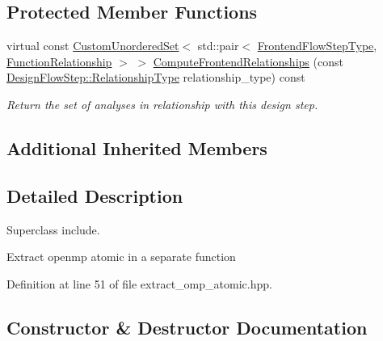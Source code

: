 \subsection*{Protected Member Functions}
\begin{DoxyCompactItemize}
\item 
virtual const \hyperlink{classCustomUnorderedSet}{Custom\+Unordered\+Set}$<$ std\+::pair$<$ \hyperlink{frontend__flow__step_8hpp_afeb3716c693d2b2e4ed3e6d04c3b63bb}{Frontend\+Flow\+Step\+Type}, \hyperlink{classFrontendFlowStep_af7cf30f2023e5b99e637dc2058289ab0}{Function\+Relationship} $>$ $>$ \hyperlink{classExtractOmpAtomic_a4d219d130ec92a7fdfea32a4b7df167a}{Compute\+Frontend\+Relationships} (const \hyperlink{classDesignFlowStep_a723a3baf19ff2ceb77bc13e099d0b1b7}{Design\+Flow\+Step\+::\+Relationship\+Type} relationship\+\_\+type) const
\begin{DoxyCompactList}\small\item\em Return the set of analyses in relationship with this design step. \end{DoxyCompactList}\end{DoxyCompactItemize}
\subsection*{Additional Inherited Members}


\subsection{Detailed Description}
Superclass include. 

Extract openmp atomic in a separate function 

Definition at line 51 of file extract\+\_\+omp\+\_\+atomic.\+hpp.



\subsection{Constructor \& Destructor Documentation}
\mbox{\label{classExtractOmpAtomic_a449debb45bef665320d88fee731ee540}} 
